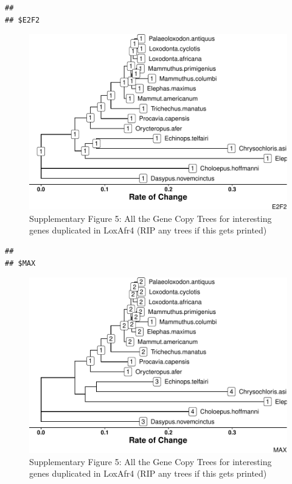 \documentclass[10pt,letterpaper]{article}
\begin{document}
\begin{verbatim}
## 
## $E2F2
\end{verbatim}

\begin{figure}
\centering
\includegraphics{paper_PLOS_draft_files/figure-latex/Supplementary Figure 5-4.pdf}
\caption{Supplementary Figure 5: All the Gene Copy Trees for interesting
genes duplicated in LoxAfr4 (RIP any trees if this gets printed)}
\end{figure}

\begin{verbatim}
## 
## $MAX
\end{verbatim}

\begin{figure}
\centering
\includegraphics{paper_PLOS_draft_files/figure-latex/Supplementary Figure 5-5.pdf}
\caption{Supplementary Figure 5: All the Gene Copy Trees for interesting
genes duplicated in LoxAfr4 (RIP any trees if this gets printed)}
\end{figure}
\end{document}
